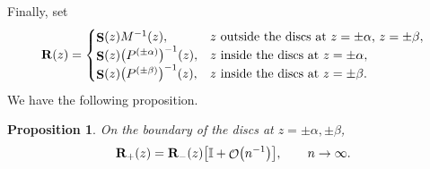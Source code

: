 \documentclass[pdftex]{sigma}
\DeclareMathOperator{\OO}{\mathcal{O}}
\DeclareMathOperator{\boldS}{{\bf S}}
\numberwithin{equation}{section}
\newtheorem{Proposition}[Theorem]{Proposition}
 { \theoremstyle{definition}
\newtheorem{Definition}[Theorem]{Definition}
\newtheorem{Note}[Theorem]{Note}
\newtheorem{Example}[Theorem]{Example}
\newtheorem{Remark}[Theorem]{Remark} }
\begin{document}
Finally, set
 \begin{equation*}
 {\bf R}(z) =
 \begin{cases}
 \boldS(z) M^{-1}(z), & \text{$z$ outside the discs at $z=\pm\alpha$, $z=\pm\beta$},\\
 \boldS(z) \bigl(P^{(\pm\alpha)} \bigr)^{-1}(z), & \text{$z$ inside the discs at $z=\pm\alpha$},\\
 \boldS(z) \bigl(P^{(\pm\beta)} \bigr)^{-1}(z), & \text{$z$ inside the discs at $z=\pm\beta$}.
 \end{cases}
 \end{equation*}
We have the following proposition.

\begin{Proposition}
 On the boundary of the discs at $z=\pm\alpha,\pm\beta$,
 \begin{equation*}
 {\bf R}_+(z) = {\bf R}_-(z) \bigl[\mathbb{I} + \OO \bigl(n^{-1}\bigr) \bigr], \qquad n\to\infty.
 \end{equation*}
\end{Proposition}
\end{document}
